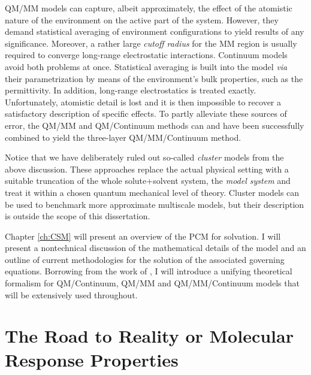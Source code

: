 \acrshort{QM}/\acrshort{MM} models can capture, albeit approximately, the effect
of the atomistic nature of the environment on the active part of the
system.
However, they demand statistical averaging of environment configurations
to yield results of any significance. Moreover, a rather large
\emph{cutoff radius} for the \acrshort{MM} region is usually required to converge
long-range electrostatic interactions.\autocite{Steindal2011-ki}
Continuum models avoid both problems at once. Statistical averaging is
built into the model \emph{via} their parametrization by
means of the environment's bulk properties, such as the permittivity.
In addition, long-range electrostatics is treated exactly.
Unfortunately, atomistic detail is lost and it is then impossible to
recover a satisfactory description of specific effects.
To partly alleviate these sources of error, the
\acrshort{QM}/\acrshort{MM} and \acrshort{QM}/Continuum methods can and
have been successfully combined to yield the three-layer
\acrshort{QM}/\acrshort{MM}/Continuum method.\autocite{Steindal2011-ki,
Lipparini2011-rd, Caprasecca2012-ir, Lipparini2013-ud}

Notice that we have deliberately ruled out so-called \emph{cluster}
models from the above discussion.
These approaches replace the actual physical setting with a suitable
truncation of the whole solute+solvent system, the \emph{model system}
and treat it within a chosen quantum mechanical level of theory.
Cluster models can be used to benchmark more approximate multiscale
models, but their description is outside the scope of this dissertation.

Chapter \ref{ch:CSM} will present an overview of the \gls{PCM} for
solvation.
I will present a nontechnical discussion of the mathematical details of
the model and an outline of current methodologies for the solution of
the associated governing equations.
Borrowing from the work of \citeauthor{Lipparini2010-be},\autocite{Lipparini2010-be,
Lipparini2015-lq} I will introduce a unifying theoretical formalism for
\acrshort{QM}/Continuum, \acrshort{QM}/\acrshort{MM} and \acrshort{QM}/\acrshort{MM}/Continuum models that will
be extensively used throughout.

\section*{The Road to Reality or Molecular Response Properties}

